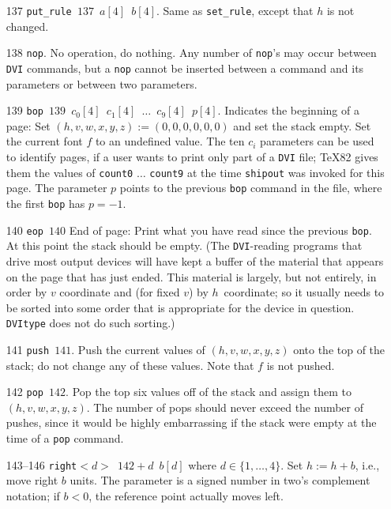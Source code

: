 \documentclass[10pt, a4paper]{article}
\begin{document}
\begin{itemize}
\item[137] \texttt{put\_rule $137$ $a[4]$ $b[4]$}. 
Same as \texttt{set\_rule}, except that $h$ is not changed. 

\item[138] \texttt{nop}. 
No operation, do nothing. Any number of \texttt{nop}'s
may occur between \texttt{DVI} commands, 
but a \texttt{nop} cannot be inserted 
between a command and its parameters or between two parameters. 

\item[139] \texttt{bop $139$ $c_0[4]$ $c_1[4]$ $\ldots$ $c_9[4]$ $p[4]$}. 
Indicates the beginning of a page: 
Set $(h,v,w,x,y,z):=(0,0,0,0,0,0)$ and set the stack empty. 
Set the current font $f$ to an undefined value.  
The ten $c_i$ parameters can be used to identify pages, 
if a user wants to print only part of a \texttt{DVI} file; 
\TeX82 gives them the values of \texttt{count0} $\ldots$ \texttt{count9} 
at the time \texttt{shipout} was invoked for this page.  
The parameter $p$ points to the previous \texttt{bop} command in the file, 
where the first \texttt{bop} has $p=-1$.

\item[140] \texttt{eop $140$} 
End of page: 
Print what you have read since the previous \texttt{bop}. 
At this point the stack should be empty. 
(The \texttt{DVI}-reading programs that drive most output devices 
will have kept a buffer of the material 
that appears on the page that has just ended. 
This material is largely, but not entirely, 
in order by $v$ coordinate and (for fixed $v$) by $h$~coordinate; 
so it usually needs to be sorted into some order that is
appropriate for the device in question. 
\texttt{DVItype} does not do such sorting.)


\item[141] \texttt{push $141$}. 
Push the current values of $(h,v,w,x,y,z)$ onto the top of the stack; 
do not change any of these values. Note that $f$ is not pushed. 


\item[142] \texttt{pop $142$}. 
Pop the top six values off of the stack and assign them to $(h,v,w,x,y,z)$. 
The number of pops should never exceed the number of pushes, 
since it would be highly embarrassing if the stack were empty 
at the time of a \texttt{pop} command.

\item[143--146] \texttt{right$<d>$ $142+d$ $b[d]$} where $d\in\{1,\dots,4\}$. 
Set $h:=h+b$, i.e., move right $b$ units.
The parameter is a signed number in two's complement notation; 
if $b<0$, the reference point actually moves left.


\end{itemize}
\end{document}
